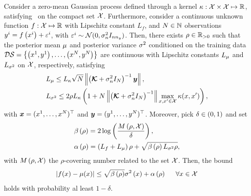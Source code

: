 \begin{lemma}%
   \label{LEMMA:PREP-MEAN-BOUND}
   Consider a zero-mean Gaussian process defined through a kernel $\kappa: \mathcal{X} \times \mathcal{X} \mapsto \mathbb{R}$,
   satisfying~ on the compact set $\mathcal{X}$. Furthermore, consider
   a continuous unknown function $f: \mathcal{X} \mapsto \mathbb{R}$ with Lipschitz constant $L_f$, and $N \in \mathbb{N}$ observations
   $y^i = f \left( x^i \right) + \varepsilon^i$, with $\varepsilon^i \sim \mathcal{N}(0, \sigma_n^2 I_{nn_{y}})$.
   Then, there exists $\rho \in \mathbb{R}_{>0}$ such that the posterior mean $\mu$ and posterior variance $\sigma^2$ conditioned on the training data
   $\mathcal{DS} = \left\{ \left( x^1, y^1 \right), \dots, \left( x^N, y^N \right) \right\}$
   are continuous with Lipschitz constants $L_{\mu}$ and $L_{\sigma^2}$ on $\mathcal{X}$, respectively, satisfying
   \begin{equation*}
		\begin{split}
			& L_{\mu} \le L_{\kappa} \sqrt{N} \left \lVert {\left(\boldsymbol{\mathcal{K}}+ \sigma_n^2I_N \right)^{-1} \boldsymbol{y}} \right \rVert, \\
			& L_{\sigma^2} \le 2 \rho L_{\kappa} \left( 1 + N \left \lVert {\left(\boldsymbol{\mathcal{K}}+ \sigma_n^2I_N \right)^{-1}} \right \rVert \max_{x, x' \in \mathcal{X}} \kappa(x,x') \right),
		\end{split}
   \end{equation*}
   with $\boldsymbol{x} = (x^1, \dots, x^N)^{\top}$ and $\boldsymbol{y} = (y^1, \dots, y^N)^{\top}$.
   Moreover, pick $\delta \in \left( 0,1 \right)$ and set
   \begin{equation*}
		\begin{split}
			& \beta \left( \rho \right) = 2 \log \left( \frac{M \left( \rho, \mathcal{X} \right)}{\delta} \right), \\
			& \alpha \left( \rho \right) = \left( L_{f} + L_{\mu} \right) \rho + \sqrt{\beta \left( \rho \right) L_{\sigma^2} \rho},
		\end{split}
   \end{equation*}
   with $M \left( \rho, \mathcal{X} \right)$ the $\rho$-covering number related to the set $\mathcal{X}$.
   Then, the bound
   \begin{equation*}
      \left| f(x) - \mu(x) \right| \le \sqrt{\beta \left( \rho \right)} \sigma^2 \left( x \right) + \alpha \left( \rho \right) \hspace*{0.5cm} \forall x \in \mathcal{X}
   \end{equation*}
   holds with probability al least $1 - \delta$.
\end{lemma}

